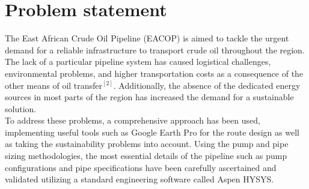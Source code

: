\documentclass[12pt]{article}
\begin{document}
      \section{Problem statement}
      {\fontsize{12pt}{12pt}

      \hspace*{1em} The East African Crude Oil Pipeline (EACOP) is aimed to tackle the urgent demand for a reliable infrastructure to transport crude oil throughout the region. The lack of a particular pipeline system has caused logistical challenges, environmental problems, and higher transportation costs as a consequence of the other means of oil transfer$^{[2]}$. Additionally, the absence of the dedicated energy sources in most parts of the region has increased the demand for a sustainable solution. \\

      To address these problems, a comprehensive approach has been used, implementing useful tools such as Google Earth Pro for the route design as well as taking the sustainability problems into account. Using the pump and pipe sizing methodologies, the most essential details of the pipeline such as pump configurations and pipe specifications have been carefully ascertained and validated utilizing a standard engineering software called Aspen HYSYS. \\

      }
\end{document}
